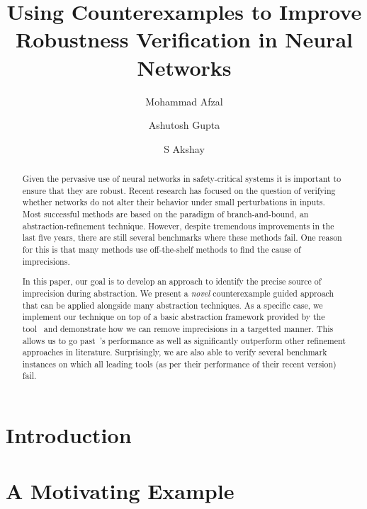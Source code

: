 \documentclass{llncs}
\title{Using Counterexamples to Improve Robustness Verification in Neural Networks}
\author{}
\institute{}
\author{Mohammad Afzal\inst{1,2}\and Ashutosh Gupta\inst{1}\and S Akshay\inst{1}}
\institute{Indian Institute of Technology, Bombay, India\and TCS Research, Pune, India}
\begin{document}
\maketitle

\begin{abstract}
  Given the pervasive use of neural networks in safety-critical systems it is important to ensure that they are robust. Recent research has focused on the question of verifying whether networks do not alter their behavior under small perturbations in inputs. Most successful methods are based on the paradigm of branch-and-bound, an abstraction-refinement technique. However, despite tremendous improvements in the last five years, there are still several benchmarks where these methods fail. One reason for this is that many methods use off-the-shelf methods to find the cause of imprecisions.  

  In this paper, our goal is to develop an approach to identify the precise source of imprecision during abstraction. We present a {\em novel} counterexample guided approach that can be applied alongside many abstraction techniques. As a specific case, we implement our technique on top of a basic abstraction framework provided by the tool~\deeppoly{} and demonstrate how we can remove imprecisions in a targetted manner. This allows us to go past~\deeppoly{}'s performance as well as significantly outperform other refinement approaches in literature. Surprisingly, we are also able to verify several benchmark instances on which all leading tools (as per their performance of their recent version) fail. 

\end{abstract}

\section{Introduction}
\label{sec:intro}



\section{A Motivating Example}
\label{sec:motivation}

\end{document}

